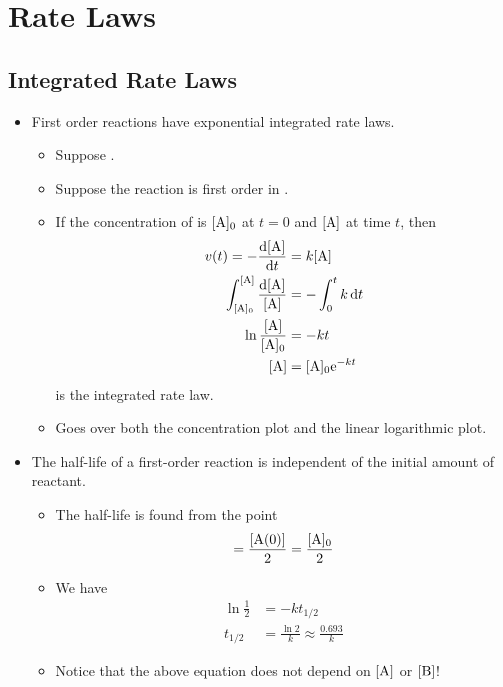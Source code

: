 \documentclass[../notes.tex]{subfiles}
\begin{document}
\chapter{Rate Laws}
\section{Integrated Rate Laws}
\begin{itemize}
    \item {}First order reactions have exponential integrated rate laws.
    \begin{itemize}
        \item Suppose .
        \item Suppose the reaction is first order in .
        \item If the concentration of  is $[\ce{A}]_0$ at $t=0$ and $[\ce{A}]$ at time $t$, then
        \begin{align*}
            v(t) = -\dv{[\ce{A}]}{t} &= k[\ce{A}]\\
            \int_{[\ce{A}]_0}^{[\ce{A}]}\frac{\dd{[\ce{A}]}}{[\ce{A}]} &= -\int_0^tk\dd{t}\\
            \ln\frac{[\ce{A}]}{[\ce{A}]_0} &= -kt\\
            [\ce{A}] &= [\ce{A}]_0\e[-kt]
        \end{align*}
        is the integrated rate law.
        \item Goes over both the concentration plot and the linear logarithmic plot.
    \end{itemize}
    \item The half-life of a first-order reaction is independent of the initial amount of reactant.
    \begin{itemize}
        \item The half-life is found from the point
        \begin{equation*}
            [\ce{A}(t_{1/2})] = \frac{[\ce{A}(0)]}{2}
            = \frac{[\ce{A}]_0}{2}
        \end{equation*}
        \item We have
        \begin{align*}
            \ln\frac{1}{2} &= -kt_{1/2}\\
            t_{1/2} &= \frac{\ln 2}{k} \approx \frac{0.693}{k}
        \end{align*}
        \item Notice that the above equation does not depend on $[\ce{A}]$ or $[\ce{B}]$!

\end{itemize}
\end{itemize}
\end{document}
